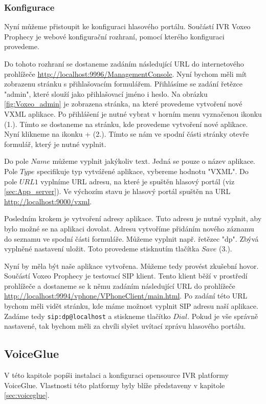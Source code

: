 \documentclass[ing,male,java,dept460,twoside]{diploma}						%
\begin{document}
\subsubsection{Konfigurace}


Nyní můžeme přistoupit ke konfiguraci hlasového portálu. Součástí IVR Voxeo Prophecy je webové konfigurační rozhraní, pomocí kterého konfiguraci provedeme.

Do tohoto rozhraní se dostaneme zadáním následující URL do internetového prohlížeče \url{http://localhost:9996/ManagementConsole}. Nyní bychom měli mít zobrazenu stránku s přihlašovacím formulářem. Přihlásíme se zadání řetězce "admin", které slouží jako přihlašovací jméno i heslo. Na obrázku \ref{fig:Voxeo_admin} je zobrazena stránka, na které provedeme vytvoření nové VXML aplikace. Po přihlášení je nutné vybrat v horním menu vyznačenou ikonku (1.). Tímto se dostaneme na stránku, kde provedeme vytvoření nové aplikace. Nyní klikneme na ikonku + (2.). Tímto se nám ve spodní části stránky otevře formulář, který je nutné vyplnit.

Do pole $Name$ můžeme vyplnit jakýkoliv text. Jedná se pouze o název aplikace. Pole $Type$ specifikuje typ vytvářené aplikace, vybereme hodnotu "VXML". Do pole $URL1$ vyplníme URL adresu, na které je spuštěn hlasový portál (viz \ref{sec:App_server}). Ve výchozím stavu je hlasový portál spuštěn na URL \url{http://localhost:9000/vxml}.

Posledním krokem je vytvoření adresy aplikace. Tuto adresu je nutné vyplnit, aby bylo možné se na aplikaci dovolat. Adresu vytvoříme přidáním nového záznamu do seznamu ve spodní části formuláře. Můžeme vyplnit např. řetězec "dp". Zbývá vyplněné nastavení uložit. Toto provedeme stisknutím tlačítka $Save$ (3.).

Nyní by měla být naše aplikace vytvořena. Můžeme tedy provést zkušební hovor. Součástí Voxeo Prophecy je testovací SIP klient. Tento klient běží v prostředí prohlížeče a dostaneme se k němu zadáním následující URL do prohlížeče \url{http://localhost:9994/vphone/VPhoneClient/main.html}. Po zadání této URL bychom měli vidět stránku, kde máme možnost vyplnit SIP adresu naší aplikace. Zadáme tedy \texttt{sip:dp@localhost} a stiskneme tlačítko $Dial$. Pokud je vše správně nastavené, tak bychom měli za chvíli slyšet uvítací zprávu hlasového portálu.

\subsection{VoiceGlue}
\label{sec:voiceglue_conf}
V této kapitole popíši instalaci a konfiguraci opensource IVR platformy VoiceGlue. Vlastnosti této platformy byly blíže představeny v kapitole \ref{sec:voiceglue}.
\end{document}
